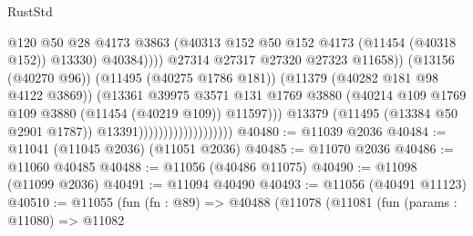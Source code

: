 \begin{lexlean}{RustStd}
\begin{coremodule}
                                                        @120
                                                        @50
                                                        @28
                                                        @4173
                                                        @3863
                                                        (@40313
                                                          @152
                                                          @50
                                                          @152
                                                          @4173
                                                          (@11454 (@40318 @152))
                                                          @13330)
                                                        @40384))))
                                                @27314
                                                @27317
                                                @27320
                                                @27323
                                                @11658))
                                            (@13156 (@40270 @96))
                                            (@11495 (@40275 @1786 @181))
                                            (@11379 (@40282 @181 @98 @4122 @3869))
                                            (@13361
                                              @39975
                                              @3571
                                              @131
                                              @1769
                                              @3880
                                              (@40214
                                                @109
                                                @1769
                                                @109
                                                @3880
                                                (@11454 (@40219 @109))
                                                @11597)))
                                          @13379
                                          (@11495 (@13384 @50 @2901 @1787))
                                          @13391)))))))))))))))))))
@40480 := @11039 @2036
@40484 := @11041 (@11045 @2036) (@11051 @2036)
@40485 := @11070 @2036
@40486 := @11060 @40485
@40488 := @11056 (@40486 @11075)
@40490 := @11098 (@11099 @2036)
@40491 := @11094 @40490
@40493 := @11056 (@40491 @11123)
@40510 := @11055
    (fun (fn : @89) =>
    @40488
      (@11078
        (@11081
          (fun (params : @11080) =>
          @11082

\end{coremodule}
\end{lexlean}
